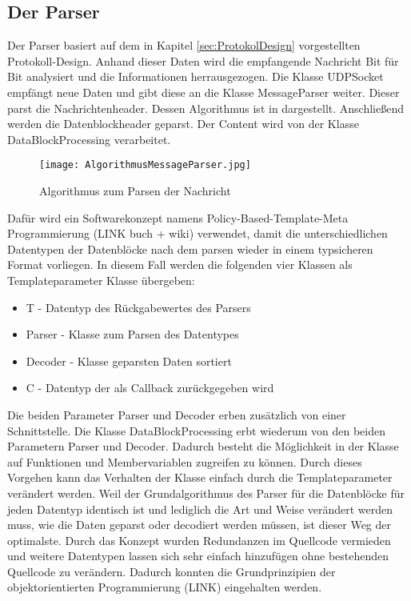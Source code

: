 \subsection{Der Parser}

Der Parser basiert auf dem in Kapitel \ref{sec:ProtokolDesign}
vorgestellten Protokoll-Design.
Anhand dieser Daten wird die empfangende Nachricht Bit für Bit analysiert
und die Informationen herrausgezogen. 
Die Klasse UDPSocket empfängt neue Daten und gibt diese an
die Klasse MessageParser weiter. Dieser parst die Nachrichtenheader. Dessen
Algorithmus ist in  dargestellt.
Anschließend werden die Datenblockheader geparst. Der Content wird von der
Klasse DataBlockProcessing verarbeitet.

\begin{figure}[htb]
\centering
\texttt{[image: AlgorithmusMessageParser.jpg]}
\caption{Algorithmus zum Parsen der Nachricht}
\label{fig:AlgorithmusMessageParser}
\end{figure}

Dafür wird ein Softwarekonzept namens Policy-Based-Template-Meta Programmierung
(LINK buch + wiki) verwendet, damit die unterschiedlichen Datentypen der
Datenblöcke nach dem parsen wieder in einem typsicheren Format vorliegen.
In diesem Fall werden die folgenden vier Klassen als Templateparameter Klasse
übergeben:

\begin{itemize}
\item T - Datentyp des Rückgabewertes des Parsers
\item Parser - Klasse zum Parsen des Datentypes
\item Decoder - Klasse geparsten Daten sortiert
\item C - Datentyp der als Callback zurückgegeben wird
\end{itemize}

Die beiden Parameter Parser und Decoder erben zusätzlich von einer
Schnittstelle. Die Klasse DataBlockProcessing erbt
wiederum von den beiden Parametern Parser und Decoder.
Dadurch besteht die Möglichkeit in der Klasse auf Funktionen und
Membervariablen zugreifen zu können.
Durch dieses Vorgehen kann das Verhalten der Klasse einfach durch die
Templateparameter verändert werden. Weil der Grundalgorithmus des Parser für
die Datenblöcke für jeden Datentyp identisch ist und lediglich die Art und
Weise verändert werden muss, wie die Daten geparst oder decodiert werden müssen,
ist dieser Weg der optimalste. Durch das Konzept wurden
Redundanzen im Quellcode vermieden und weitere Datentypen lassen sich
sehr einfach hinzufügen ohne bestehenden Quellcode zu verändern. Dadurch konnten
die Grundprinzipien der objektorientierten Programmierung (LINK)
eingehalten werden.
\newline 

